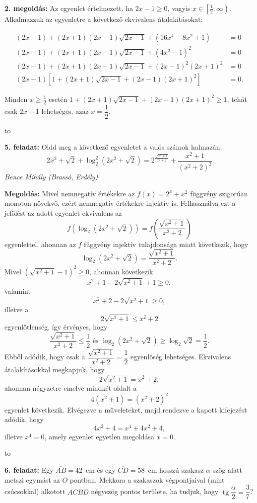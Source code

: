 \documentclass[a4paper,10pt]{article}
\newcommand{\ki}[2]{\hfill {\it #1 (#2)}\medskip}
\newcommand{\vonal}{\hbox to \hsize{\hskip2truecm\hrulefill\hskip2truecm}}
\newcommand{\tg}{\mathop{\mathrm{tg}}\nolimits}
\begin{document}
{\bf 2. megoldás: } Az egyenlet értelmezett, ha 
$2x-1\ge 0$, vagyis $x\in\left[\frac{1}{2};\infty\right)$.  Alkalmazzuk az egyenletre a következő ekvivalens átalakításokat:

\begin{align*}
(2x-1)+(2x+1)(2x-1)\sqrt{2x-1}+(16x^4-8x^2+1)&=0\\
(2x-1)+(2x+1)(2x-1)\sqrt{2x-1}+(4x^2-1)^2&=0\\
(2x-1)+(2x+1)(2x-1)\sqrt{2x-1}+(2x-1)^2(2x+1)^2&=0\\
(2x-1)\left[
1+(2x+1)\sqrt{2x-1}+(2x-1)(2x+1)^2
\right]&=0.
\end{align*}

Minden $x\ge \frac{1}{2}$ esetén 
$1+(2x+1)\sqrt{2x-1}+(2x-1)(2x+1)^2\ge 1$, tehát csak $2x-1$ lehetséges, azaz $x=\dfrac{1}{2}$.

\vonal


{\bf 5. feladat: } Oldd meg a következő egyenletet a valós számok halmazán:
$$2x^2+\sqrt{2}+\log_2^2\left(2x^2+\sqrt 2\right)=2^{\frac{\sqrt{x^2+1}}{x^2+2}}+\frac{x^2+1}{(x^2+2)^2}$$
\ki{Bence Mihály}{Brassó, Erdély}\medskip

{\bf Megoldás: } Mivel nemnegatív értékekre az  $f(x)=2^x+x^2$ függvény szigorúan monoton növekvő, ezért nemnegatív értékekre injektív is. Felhasználva ezt a jelölést az adott egyenlet ekvivalens az 
$$
f\left(\log_2\left(2x^2+\sqrt{2}\right)\right)=
f\left(\frac{\sqrt{x^2+1}}{x^2+2}\right)
$$
egyenlettel, ahonnan az $f$ függvény injektív tulajdonsága miatt következik, hogy
$$\log_2\left(2x^2+\sqrt{2}\right)=\frac{\sqrt{x^2+1}}{x^2+2}.$$
Mivel $\left(\sqrt{x^2+1}-1\right)^2\ge 0$, ahonnan következik 
$$x^2+1-2\sqrt{x^2+1}+1\ge 0,$$
valamint 
$$x^2+2-2\sqrt{x^2+1}\ge 0,$$
illetve a 
$$2\sqrt{x^2+1}\le x^2+2$$
egyenlőtlenség, így érvényes, hogy
$$
\frac{\sqrt{x^2+1}}{x^2+2}\le \frac{1}{2} 
\text{~és~} 
\log_2\left(2x^2+\sqrt 2\right)\ge \log_2 \sqrt{2} =\frac{1}{2}
. 
$$
Ebből adódik, hogy csak a 
$\dfrac{\sqrt{x^2+1}}{x^2+2}=\dfrac{1}{2}$ egyenlőség lehetséges. 
Ekvivalens átalakításokkal megkapjuk, hogy 
$$2\sqrt{x^2+1}=x^2+2,$$
ahonnan négyzetre emelve mindkét oldalt a 
$$4(x^2+1)=(x^2+2)^2$$
egyenlet következik. Elvégezve a műveleteket, majd rendezve a kapott kifejezést adódik, hogy
$$4x^2+4=x^4+4x^2+4,$$
illetve $x^4=0$, amely egyenlet egyetlen megoldása $x=0$.

\vonal


{\bf 6. feladat: } Egy $\overline{AB}=42$~cm és egy $\overline{CD}=58$~cm hosszú szakasz $\alpha$ szög alatt metszi
egymást az $O$ pontban. Mekkora a szakaszok végpontjaival (mint csúcsokkal)
alkotott $ACBD$ négyszög pontos területe, ha tudjuk, hogy 
$\tg\dfrac{\alpha}{2}=\dfrac{3}{7}$?
\end{document}
